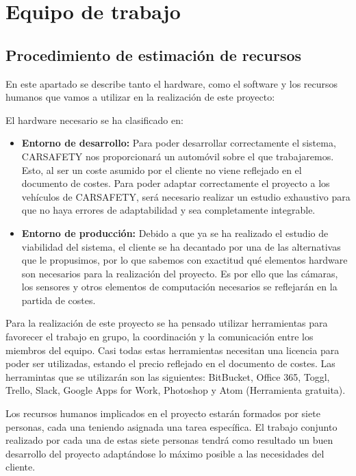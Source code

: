 
\section{Equipo de trabajo}
\subsection{Procedimiento de estimación de recursos}
\par En este apartado se describe tanto el hardware, como el software y los recursos humanos que vamos a utilizar en la realización de este proyecto:
\par El hardware necesario se ha clasificado en:
\begin{itemize}[-]
\item \textbf{Entorno de desarrollo:} Para poder desarrollar correctamente el sistema, CARSAFETY nos proporcionará un automóvil sobre el que trabajaremos. Esto, al ser un coste asumido por el cliente no viene reflejado en el documento de costes. Para poder adaptar correctamente el proyecto a los vehículos de CARSAFETY, será necesario realizar un estudio exhaustivo para que no haya errores de adaptabilidad y sea completamente integrable.
\item \textbf{Entorno de producción:} Debido a que ya se ha realizado el estudio de viabilidad del sistema, el cliente se ha decantado por una de las alternativas que le propusimos, por lo que sabemos con exactitud qué elementos hardware son necesarios para la realización del proyecto. Es por ello que las cámaras, los sensores y otros elementos de computación necesarios se reflejarán en la partida de costes.
\end{itemize}
\par Para la realización de este proyecto se ha pensado utilizar herramientas para favorecer el trabajo en grupo, la coordinación y la comunicación entre los miembros del equipo. Casi todas estas herramientas necesitan una licencia para poder ser utilizadas, estando el precio reflejado en el documento de costes. Las herramintas que se utilizarán son las siguientes: BitBucket, Office 365, Toggl, Trello, Slack, Google Apps for Work, Photoshop y Atom (Herramienta gratuita).
\par Los recursos humanos implicados en el proyecto estarán formados por siete personas, cada una teniendo asignada una tarea específica. El trabajo conjunto realizado por cada una de estas siete personas tendrá como resultado un buen desarrollo del proyecto adaptándose lo máximo posible a las necesidades del cliente.


